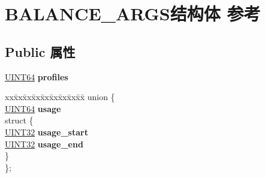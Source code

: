 \hypertarget{struct_b_a_l_a_n_c_e___a_r_g_s}{}\section{B\+A\+L\+A\+N\+C\+E\+\_\+\+A\+R\+G\+S结构体 参考}
\label{struct_b_a_l_a_n_c_e___a_r_g_s}
\subsection*{Public 属性}
\begin{DoxyCompactItemize}
\item 
\mbox{\label{struct_b_a_l_a_n_c_e___a_r_g_s_ac01923e671938344db453baf11391f20}} 
\hyperlink{_processor_bind_8h_a57be03562867144161c1bfee95ca8f7c}{U\+I\+N\+T64} {\bfseries profiles}
\item 
\mbox{\label{struct_b_a_l_a_n_c_e___a_r_g_s_a7c1ceb7b8c4d765ebda39a777ab722b7}} 
\begin{tabbing}
xx\=xx\=xx\=xx\=xx\=xx\=xx\=xx\=xx\=\kill
union \{\\
\>\hyperlink{_processor_bind_8h_a57be03562867144161c1bfee95ca8f7c}{UINT64} {\bfseries usage}\\
\mbox{\label{union_b_a_l_a_n_c_e___a_r_g_s_1_1_0D568_a5c7a77b0bfc014c9296528992064d4c4}} 
\>struct \{\\
\>\>\hyperlink{_processor_bind_8h_ae1e6edbbc26d6fbc71a90190d0266018}{UINT32} {\bfseries usage\_start}\\
\>\>\hyperlink{_processor_bind_8h_ae1e6edbbc26d6fbc71a90190d0266018}{UINT32} {\bfseries usage\_end}\\
\>\} \\
\}; \\


\end{tabbing}
\end{DoxyCompactItemize}
